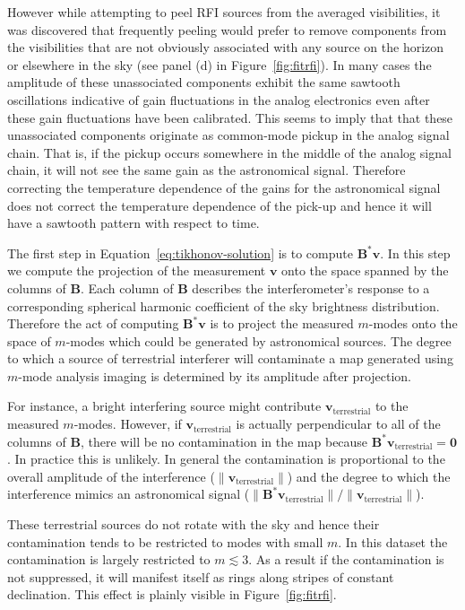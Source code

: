\documentclass[twocolumn]{aastex61}
\renewcommand{\b}{\pmb}
\newcommand{\todo}[1]{\textcolor{red}{TODO: #1}\PackageWarning{TODO:}{#1!}}
\begin{document}
However while attempting to peel RFI sources from the averaged visibilities, it was discovered that
frequently peeling would prefer to remove components from the visibilities that are not obviously
associated with any source on the horizon or elsewhere in the sky (see panel (d) in
Figure~\ref{fig:fitrfi}). In many cases the amplitude of these unassociated components exhibit the
same sawtooth oscillations indicative of gain fluctuations in the analog electronics even after
these gain fluctuations have been calibrated. This seems to imply that that these unassociated
components originate as common-mode pickup in the analog signal chain. That is, if the pickup occurs
somewhere in the middle of the analog signal chain, it will not see the same gain as the
astronomical signal. Therefore correcting the temperature dependence of the gains for the
astronomical signal does not correct the temperature dependence of the pick-up and hence it will
have a sawtooth pattern with respect to time.

The first step in Equation~\ref{eq:tikhonov-solution} is to compute $\b B^*\b v$. In this step we
compute the projection of the measurement $\b v$ onto the space spanned by the columns of $\b B$.
Each column of $\b B$ describes the interferometer's response to a corresponding spherical harmonic
coefficient of the sky brightness distribution. Therefore the act of computing $\b B^*\b v$ is to
project the measured $m$-modes onto the space of $m$-modes which could be generated by astronomical
sources. The degree to which a source of terrestrial interferer will contaminate a map generated
using $m$-mode analysis imaging is determined by its amplitude after projection.

For instance, a bright interfering source might contribute $\b v_\text{terrestrial}$ to the measured
$m$-modes. However, if $\b v_\text{terrestrial}$ is actually perpendicular to all of the columns of
$\b B$, there will be no contamination in the map because $\b B^*\b v_\text{terrestrial} = \b 0$.
In practice this is unlikely. In general the contamination is proportional to the overall amplitude
of the interference ($\|\b v_\text{terrestrial}\|$) and the degree to which the interference mimics
an astronomical signal ($\|\b B^*\b v_\text{terrestrial}\|/\|\b v_\text{terrestrial}\|$).


These terrestrial sources do not rotate with the sky and hence their contamination tends to be
restricted to modes with small $m$. In this dataset the contamination is largely restricted to $m
\lesssim 3$. As a result if the contamination is not suppressed, it will manifest itself as rings
along stripes of constant declination. This effect is plainly visible in Figure~\ref{fig:fitrfi}.
\end{document}

